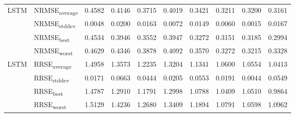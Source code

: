 {\begin{longtable}{l l c c c c c c c c}
\cmidrule(lr){2-10}
\multirow{4}{*}{LSTM} & NRMSE\textsubscript{average} & 0.4582 & 0.4146 & 0.3715 & 0.4019 & 0.3421 & 0.3211 & 0.3200 & 0.3161 \\
 & NRMSE\textsubscript{stddev} & 0.0048 & 0.0200 & 0.0163 & 0.0072 & 0.0149 & 0.0060 & 0.0015 & 0.0167 \\
 & NRMSE\textsubscript{best} & 0.4534 & 0.3946 & 0.3552 & 0.3947 & 0.3272 & 0.3151 & 0.3185 & 0.2994 \\
 & NRMSE\textsubscript{worst} & 0.4629 & 0.4346 & 0.3878 & 0.4092 & 0.3570 & 0.3272 & 0.3215 & 0.3328 \\
\cmidrule(lr){2-10}
\multirow{4}{*}{LSTM} & RRSE\textsubscript{average} & 1.4958 & 1.3573 & 1.2235 & 1.3204 & 1.1341 & 1.0600 & 1.0554 & 1.0413 \\
 & RRSE\textsubscript{stddev} & 0.0171 & 0.0663 & 0.0444 & 0.0205 & 0.0553 & 0.0191 & 0.0044 & 0.0549 \\
 & RRSE\textsubscript{best} & 1.4787 & 1.2910 & 1.1791 & 1.2998 & 1.0788 & 1.0409 & 1.0510 & 0.9864 \\
 & RRSE\textsubscript{worst} & 1.5129 & 1.4236 & 1.2680 & 1.3409 & 1.1894 & 1.0791 & 1.0598 & 1.0962 \\
\cmidrule(lr){2-10}
\end{longtable}
}